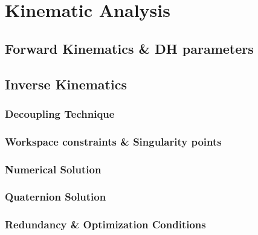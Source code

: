 \documentclass[10pt]{article}
\title{\thesistitle}
\author{Karadimos Alexios}
\date{2020}
\begin{document}








\tableofcontents
\renewcommand*\contentsname{Table of Contents}


\section{Kinematic Analysis}
\subsection{Forward Kinematics \& DH parameters}
\subsection{Inverse Kinematics}
\subsubsection{Decoupling Technique}
\subsubsection{Workspace constraints \& Singularity points}
\subsubsection{Numerical Solution}
\subsubsection{Quaternion Solution}
\subsubsection{Redundancy \& Optimization Conditions}
\end{document}
